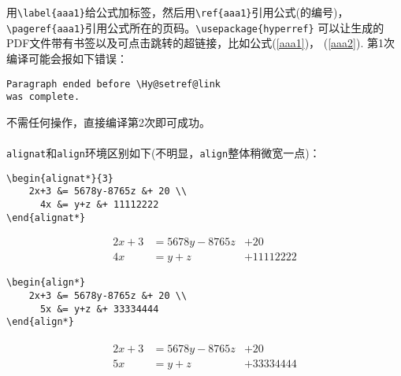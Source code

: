 \documentclass{article}
\begin{document}
\begin{multicols}{2}
\begin{enumerate}
              用\verb|\label{aaa1}|给公式加标签，然后用\verb|\ref{aaa1}|引用公式(的编号)，
              \verb|\pageref{aaa1}|引用公式所在的页码。\verb|\usepackage{hyperref}|
              可以让生成的PDF文件带有书签以及可点击跳转的超链接，比如公式(\ref{aaa1})，
              (\ref{aaa2}). 第1次编译可能会报如下错误：
              \begin{lstlisting}
Paragraph ended before \Hy@setref@link 
was complete.
\end{lstlisting}
              不需任何操作，直接编译第2次即可成功。\\
              \\
              \verb|alignat|和\verb|align|环境区别如下(不明显，\verb|align|整体稍微宽一点)：
              \begin{lstlisting}
\begin{alignat*}{3}
    2x+3 &= 5678y-8765z &+ 20 \\
      4x &= y+z &+ 11112222 
\end{alignat*}    
\end{lstlisting}
              \begin{tcolorbox}
                  \vspace{-5mm}
                  \begin{alignat*}{3}
                      2x+3 & = 5678y-8765z & + 20       \\
                      4x   & = y+z         & + 11112222
                  \end{alignat*}
              \end{tcolorbox}
              \begin{lstlisting}
\begin{align*}
    2x+3 &= 5678y-8765z &+ 20 \\
      5x &= y+z &+ 33334444 
\end{align*}    
\end{lstlisting}
              \begin{tcolorbox}
                  \vspace{-3mm}
                  \begin{align*}
                      \begin{aligned}
                          2x+3 & = 5678y-8765z & + 20       \\
                          5x   & = y+z         & + 33334444
                      \end{aligned}

\end{align*}
\end{tcolorbox}
\end{enumerate}
\end{multicols}
\end{document}
